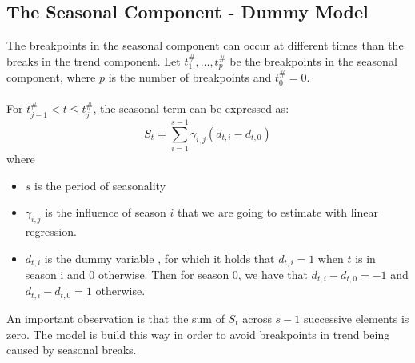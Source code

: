 \documentclass[main.tex]{subfiles}
\begin{document}
\subsection{The Seasonal Component - Dummy Model}
\label{subsec:seasonal_dummy}
The breakpoints in the seasonal component can occur at different times than the
breaks in the trend component. Let
$t_1^{\#},\hdots, t_p^{\#}$ be the breakpoints in the seasonal component,
where $p$ is the number of breakpoints and $t_0^{\#} = 0$.\\\\
For $t_{j-1}^{\#} < t \leq t_j^{\#}$, the seasonal term can be expressed as:
\[
S_t = \sum_{i=1}^{s-1}\gamma_{i,j}(d_{t, i} - d_{t, 0})
\]
where
\begin{itemize}
\item $s$ is the period of seasonality
\item $\gamma_{i,j}$  is the influence of season $i$ that we are going to estimate
with linear regression. 
\item $d_{t,i}$ is the dummy variable \cite{makridakis}, for which it holds that
  $d_{t,i} = 1$ when $t$ is in season i and 0 otherwise. Then for season 0, we
  have that $d_{t, i} - d_{t, 0} = -1$ and $d_{t, i} - d_{t, 0} = 1$ otherwise.
\end{itemize}
An important observation is that the sum of $S_t$ across $s-1$ successive elements is zero.
The model is build this way in order to avoid breakpoints in
trend being caused by seasonal breaks. 
\end{document}
